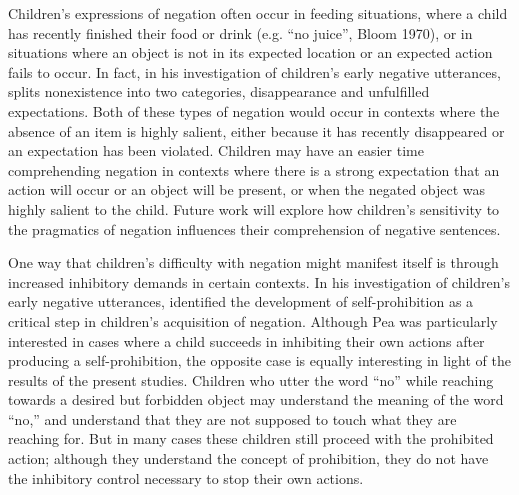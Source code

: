 \documentclass[man]{apa2}
\begin{document}
Children's expressions of negation often occur in feeding situations, where a child has recently finished their food or drink (e.g. ``no juice'', Bloom 1970), or in situations where an object is not in its expected location or an expected action fails to occur.  In fact, in his investigation of children's early negative utterances,  splits nonexistence into two categories, disappearance and unfulfilled expectations.  Both of these types of negation would occur in contexts where the absence of an item is highly salient, either because it has recently disappeared or an expectation has been violated.  Children may have an easier time comprehending negation in contexts where there is a strong expectation that an action will occur or an object will be present, or when the negated object was highly salient to the child.  Future work will explore how children's sensitivity to the pragmatics of negation influences their comprehension of negative sentences.

One way that children's difficulty with negation might manifest itself is through increased inhibitory demands in certain contexts.  In his investigation of children's early negative utterances,  identified the development of self-prohibition as a critical step in children's acquisition of negation.  Although Pea was particularly interested in cases where a child succeeds in inhibiting their own actions after producing a self-prohibition, the opposite case is equally interesting in light of the results of the present studies.  Children who utter the word ``no'' while reaching towards a desired but forbidden object may understand the meaning of the word ``no,'' and understand that they are not supposed to touch what they are reaching for.  But in many cases these children still proceed with the prohibited action; although they understand the concept of prohibition, they do not have the inhibitory control necessary to stop their own actions. 
\end{document}

